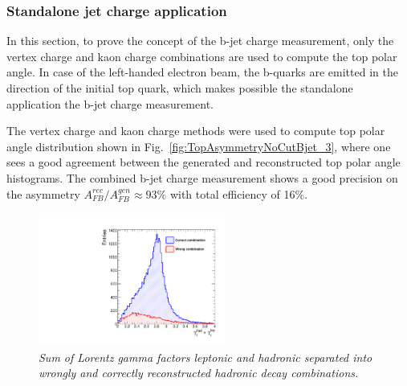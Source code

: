 \subsubsection{Standalone jet charge application}

In this section, to prove the concept of the b-jet charge measurement, only the vertex charge and kaon charge combinations are used to compute the top polar angle. 
In case of the left-handed electron beam, the b-quarks are emitted in the direction of the initial top quark, which makes possible the standalone application the b-jet charge measurement. 

The vertex charge and kaon charge methods were used to compute top polar angle distribution shown in Fig.~\ref{fig:TopAsymmetryNoCutBjet_3}, where one sees a good agreement between the generated and reconstructed top polar angle histograms. 
The combined b-jet charge measurement shows a good precision on the asymmetry $A_{FB}^{rec}/A^{gen}_{FB} \approx 93\%$ with total efficiency of 16\%.
\begin{figure}[h]
	{\centering
		\includegraphics[width=0.55\textwidth]{ILD/plots/top-gamma.pdf}
		\caption{\sl Sum of Lorentz gamma factors leptonic and hadronic separated into wrongly and correctly reconstructed hadronic decay combinations.
		}
		\label{fig:TopGamma_3}
	}
	
\end{figure}

